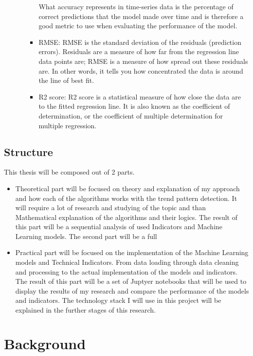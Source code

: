 \documentclass{imc-inf}
\begin{document}
\begin{enumerate}
\begin{itemize}
\begin{itemize}
				What accuracy represents in time-series data is the percentage of correct predictions that the model made over time and is therefore a good metric to use when evaluating the performance of the model.
				\item RMSE: RMSE is the standard deviation of the residuals (prediction errors).
				Residuals are a measure of how far from the regression line data points are;
				RMSE is a measure of how spread out these residuals are. In other words, it tells you how concentrated the data is around the line of best fit.
				\item R2 score: R2 score is a statistical measure of how close the data are to the fitted regression line. It is also known as the coefficient of determination,
				or the coefficient of multiple determination for multiple regression.
			\end{itemize}

	
		\end{itemize}
\end{enumerate}

\section{Structure}
This thesis will be composed out of 2 parts.

	\begin{itemize}
		\item Theoretical part will be focused on
		theory and explanation of my approach and how each of the algorithms works with
		the trend pattern detection. It will require a lot of research and studying of the topic and than Mathematical
		explanation of the algorithms and their logics. The result of this part will be a sequential analysis of used Indicators and Machine Learning models.
		The second part will be a full
		\item Practical part will be focused on the implementation of the Machine Learning models and Technical Indicators.
		From data loading through data cleaning and processing to the actual implementation of the models and indicators.
		The result of this part will be a set of Juptyer notebooks that will be used to display the results of my research
		and compare the performance of the models and indicators. The technology stack I will use in this project will be
		explained in the further stages of this research. 
	\end{itemize}




\chapter{Background}\label{chap:background}
\end{document}
